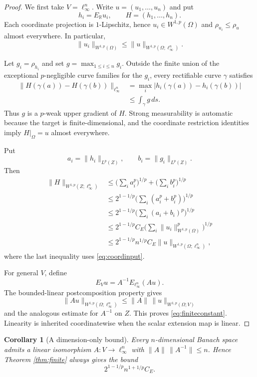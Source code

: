 \documentclass[11pt]{article}
\newtheorem{corollary}[theorem]{Corollary}
\theoremstyle{remark}
\newcommand{\R}{\mathbb{R}}
\newcommand{\Om}{\Omega}
\newcommand{\Lp}{L^p}
\newcommand{\Wp}{W^{1,p}}
\newcommand{\rhoMin}[1]{\rho_{#1}}
\newcommand{\restr}[2]{#1\vert_{#2}}
\begin{document}
\begin{proof}
We first take $V=\ell_\infty^n$.  Write
$u=(u_1,\dots,u_n)$ and put
\[
  h_i=E_{\R}u_i,
  \qquad
  H=(h_1,\dots,h_n).
\]
Each coordinate projection is $1$-Lipschitz, hence
$u_i\in\Wp(\Om)$ and $\rhoMin{u_i}\le\rhoMin{u}$ almost everywhere.  In
particular,
\begin{equation}
\label{eq:coordinput}
  \|u_i\|_{\Wp(\Om)}
  \le \|u\|_{\Wp(\Om;\ell_\infty^n)}.
\end{equation}

Let $g_i=\rhoMin{h_i}$ and set $g=\max_{1\le i\le n}g_i$.  Outside the finite
union of the exceptional $p$-negligible curve families for the $g_i$, every
rectifiable curve $\gamma$ satisfies
\[
 \begin{split}
  \|H(\gamma(a))-H(\gamma(b))\|_{\ell_\infty^n}
  &=\max_i |h_i(\gamma(a))-h_i(\gamma(b))|\\
  &\le \int_\gamma g\,ds.
 \end{split}
\]
Thus $g$ is a $p$-weak upper gradient of $H$.  Strong measurability is
automatic because the target is finite-dimensional, and the coordinate
restriction identities imply $\restr{H}{\Om}=u$ almost everywhere.

Put
\[
  a_i=\|h_i\|_{\Lp(Z)},
  \qquad b_i=\|g_i\|_{\Lp(Z)}.
\]
Then
\[
 \begin{split}
  \|H\|_{\Wp(Z;\ell_\infty^n)}
  &\le \Big(\sum_i a_i^p\Big)^{1/p}
       +\Big(\sum_i b_i^p\Big)^{1/p}\\
  &\le 2^{1-1/p}
       \Big(\sum_i(a_i^p+b_i^p)\Big)^{1/p}\\
  &\le 2^{1-1/p}
       \Big(\sum_i(a_i+b_i)^p\Big)^{1/p}\\
  &\le 2^{1-1/p}C_E
       \Big(\sum_i\|u_i\|_{\Wp(\Om)}^p\Big)^{1/p}\\
  &\le 2^{1-1/p}n^{1/p}C_E
       \|u\|_{\Wp(\Om;\ell_\infty^n)},
 \end{split}
\]
where the last inequality uses \eqref{eq:coordinput}.

For general $V$, define
\[
  E_Vu=A^{-1}E_{\ell_\infty^n}(Au).
\]
The bounded-linear postcomposition property gives
\[
  \|Au\|_{\Wp(\Om;\ell_\infty^n)}
  \le \|A\|\,\|u\|_{\Wp(\Om;V)}
\]
and the analogous estimate for $A^{-1}$ on $Z$.  This proves
\eqref{eq:finiteconstant}.  Linearity is inherited coordinatewise when the
scalar extension map is linear.
\end{proof}

\begin{corollary}[A dimension-only bound]
Every $n$-dimensional Banach space admits a linear isomorphism
$A:V\to\ell_\infty^n$ with
$\|A\|\,\|A^{-1}\|\le n$.  Hence Theorem \ref{thm:finite} always gives the
bound
\[
  2^{1-1/p}n^{1+1/p}C_E.
\]
\end{corollary}
\end{document}
